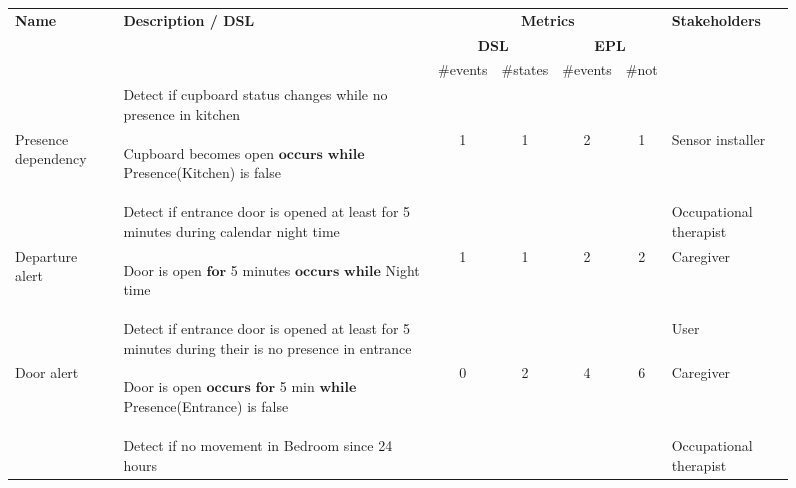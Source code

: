 \begin{figure*}[h]
  \tiny
  \begin{tabular}{|p{1.45cm}|p{8cm}|c|c|c|c|p{1.65cm}|} 
    \hline
    \multirow{3}{*}{\textbf{Name}}&\multirow{3}{*}{\textbf{Description / DSL}}&\multicolumn{4}{c|}{\textbf{Metrics}}&\multirow{3}{*}{\textbf{Stakeholders}}\\
    \cline{3-6}
                                  &                 &\multicolumn{2}{c|}{\textbf{DSL}}&\multicolumn{2}{c|}{\textbf{EPL}}&\\
                                  & & \#events & \#states & \#events & \#not &\\
    \hline
     & \cellcolor{gray!15}Detect if cupboard status changes while no presence in kitchen& & & & & \\ %
    Presence dependency  & \begin{mtext}             
      Cupboard becomes open $\textbf{occurs}$ $\textbf{while}$ Presence(Kitchen) is false 
    \end{mtext} & 1 & 1 & 2 & 1 & Sensor installer\\
    \hline
     & \cellcolor{gray!15} Detect if entrance door is opened at least for 5 minutes during calendar night time & & & & & Occupational therapist\\
    Departure alert & \begin{mtext}  
      Door is open $\textbf{for}$ 5 minutes $\textbf{occurs}$ $\textbf{while}$ Night time
    \end{mtext} & 1 & 1 & 2 & 2 & Caregiver  \\ 
    \hline
    & \cellcolor{gray!15} Detect if entrance door is opened at least for 5 minutes during their is no presence in entrance& & & & &User \\
                                  Door alert & \begin{mtext}
                                    Door is open $\textbf{occurs}$ $\textbf{for}$ 5 min $\textbf{while}$ Presence(Entrance) is false
                                  \end{mtext} & 0 & 2 & 4 & 6 &  Caregiver \\
    \hline
     &\cellcolor{gray!15} Detect if no movement in Bedroom since 24 hours & & & & & Occupational therapist \\ %

\end{tabular}
\end{figure*}
